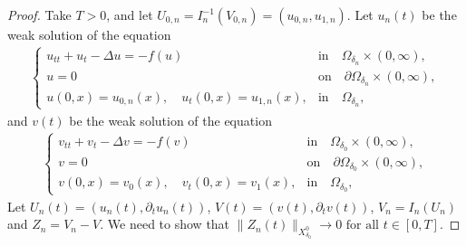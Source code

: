 \documentclass[10pt,a4paper]{amsart}
\begin{document}
\begin{proof}
    Take $T>0$, and let $U_{0,n} = I_n^{-1}(V_{0,n})=(u_{0,n},u_{1,n})$. Let  $u_n(t)$ be the weak solution of the equation
    \begin{align}\label{eq:3.1}
        \left\{\begin{array}{ll}
u_{tt} + u_t - \Delta u = -f(u) ~& \mbox{in}\quad \Omega_{\delta_n} \times (0,\infty), \\
u=0 &\mbox{on} \quad \partial \Omega_{\delta_n} \times (0, \infty), \\
u(0,x) = u_{0,n}(x), \quad u_t(0,x)=u_{1,n}(x),& \mbox{in}  \quad \Omega_{\delta_n},
\end{array}\right.\end{align}
and $v(t)$  be the weak solution of the equation
\begin{align}\label{eq:3.2}
    \left\{\begin{array}{ll}
v_{tt} + v_t - \Delta v = -f(v)~& \mbox{in}\quad \Omega_{\delta_0} \times (0,\infty), \\
v=0 &\mbox{on} \quad \partial \Omega_{\delta_0} \times (0, \infty), \\
v(0,x) = v_0(x), \quad v_t(0,x)=v_1(x),& \mbox{in}  \quad \Omega_{\delta_0},
\end{array}\right.\end{align}
Let $U_n(t) = (u_n(t), \partial_t u_n(t))$, $V(t) = (v(t), \partial_t v(t))$, $V_n = I_n(U_n)$ and $Z_n = V_n - V$. We need to show that $\|Z_n (t)\|_{X^0_{\delta_0}}\rightarrow 0 \mbox{ for all } t\in [0, T].$ 


\end{proof}
\end{document}

